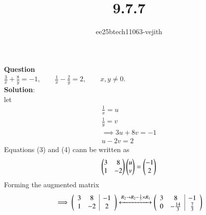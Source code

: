 \documentclass[journal]{IEEEtran}
\begin{document}

\vspace{3cm}

\title{9.7.7}
\author{ee25btech11063-vejith}

\maketitle
{\let\newpage\relax\maketitle}
\renewcommand{\thefigure}{\theenumi}
\renewcommand{\thetable}{\theenumi}
\setlength{\intextsep}{10pt} %
\textbf{Question}\\
 \quad 
$\frac{3}{x} + \frac{8}{y} = -1, 
\qquad 
\frac{1}{x} - \frac{2}{y} = 2, 
\qquad x,y \neq 0.$\\
\textbf{Solution}:\\
let 
\begin{align}
    \frac{1}{x}=u\\
    \frac{1}{y}=v\\
    \implies 3u+8v=-1\\
    u-2v=2
\end{align}
Equations (3) and (4) cann be written as
\begin{align}
    \begin{pmatrix}
        3 & 8\\
        1 & -2
    \end{pmatrix}\begin{pmatrix}u\\v\end{pmatrix}=\begin{pmatrix}-1\\2\end{pmatrix}
\end{align}
Forming the augmented matrix
\begin{align}
    \implies 
\left(\begin{array}{cc|c}
        3 & 8 & -1 \\
        1 & -2 & 2 
\end{array}\right) 
\xleftrightarrow{R_2 \rightarrow R_2-\frac{1}{3} \times R_1} \left(\begin{array}{cc|c}
        3 & 8 & -1 \\
        0 & -\frac{14}{3} & \frac{7}{3} 
\end{array}\right) 
\end{align}
\end{document}
